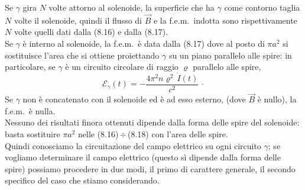 Se $\gamma$ gira $N$ volte attorno al solenoide, la superficie che ha $\gamma$
come contorno taglia $N$ volte il solenoide, quindi il flusso di $\vec B$ e la
f.e.m.\ indotta sono rispettivamente $N$ volte quelli dati dalla (8.16) e dalla
(8.17).\\
Se $\gamma$ \`e interno al solenoide, la f.e.m.\ \`e data dalla (8.17) dove al
posto di $\pi a^2$ si sostituisce l'area che si ottiene proiettando $\gamma$ su
un piano parallelo alle spire: in particolare, se $\gamma$ \`e un circuito
circolare di raggio $\varrho$ parallelo alle spire,
\begin{equation}
  \mathcal E_\gamma(t)=-\frac{4\pi^2n\varrho^2\,\dot I(t)}{c^2}\,\cdot
  \tag{8.19}
\end{equation}
Se $\gamma$ non \`e concatenato con il solenoide ed \`e ad esso esterno, (dove
$\vec B$ \`e nullo), la f.e.m.\ \`e nulla.\\
Nessuno dei risultati finora ottenuti dipende dalla forma delle spire del
solenoide: basta sostituire $\pi a^2$ nelle (8.16)\,$\div$\,(8.18) con l'area
delle spire.\\
Quindi conosciamo la circuitazione del campo elettrico su ogni circuito
$\gamma$; se vogliamo determinare il campo elettrico (questo s\`i dipende dalla
forma delle spire) possiamo procedere in due modi, il primo di carattere
generale, il secondo specifico del caso che stiamo considerando.
